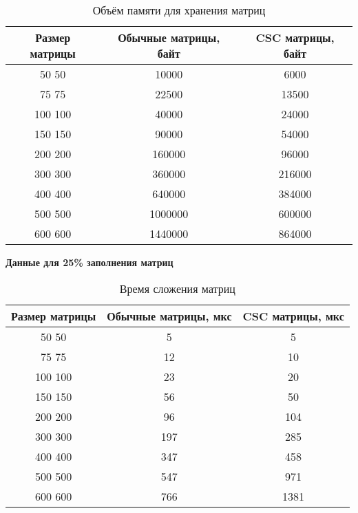 \begin{table}[H]
	\centering
	\caption{Объём памяти для хранения матриц}
	\begin{tabular}{|c|c|c|}
		\hline
		Размер матрицы & Обычные матрицы, байт & CSC матрицы, байт \\ \hline
		50  50         & 10000                 & 6000             \\ \hline
		75  75         & 22500                 & 13500             \\ \hline
		100 100        & 40000                 & 24000             \\ \hline
		150 150        & 90000                 & 54000            \\ \hline
		200 200        & 160000                & 96000            \\ \hline
		300 300        & 360000                & 216000            \\ \hline
		400 400        & 640000                & 384000           \\ \hline
		500 500        & 1000000               & 600000           \\ \hline
		600 600        & 1440000               & 864000           \\ \hline
	\end{tabular}
\end{table}

\newpage
\textbf{Данные для 25\% заполнения матриц}
\begin{table}[H]
	\centering
	\caption{Время сложения матриц}
	\begin{tabular}{|c|c|c|}
		\hline
		Размер матрицы & Обычные матрицы, мкс & CSC матрицы, мкс \\ \hline
		50  50         & 5                    & 5                \\ \hline
		75  75         & 12                   & 10                \\ \hline
		100 100        & 23                   & 20                \\ \hline
		150 150        & 56                   & 50               \\ \hline
		200 200        & 96                   & 104               \\ \hline
		300 300        & 197                  & 285               \\ \hline
		400 400        & 347                  & 458              \\ \hline
		500 500        & 547                  & 971              \\ \hline
		600 600        & 766                  & 1381              \\ \hline
	\end{tabular}
\end{table}

